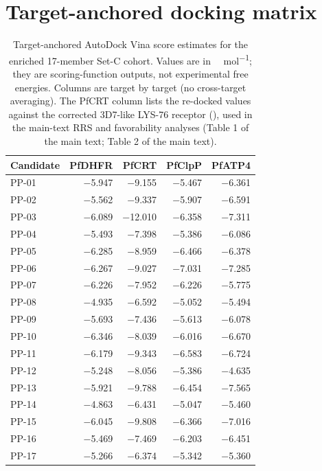 \documentclass[11pt,a4paper]{article}
\begin{document}
	\section{Target-anchored docking matrix}\label{sec:sm_vina_matrix}
	\begin{table}[ht!]
		\centering
		\caption{Target-anchored AutoDock Vina score estimates for the enriched 17-member Set-C cohort. Values are in \si{\kilo\calorie\per\mol}; they are scoring-function outputs, not experimental free energies. Columns are target by target (no cross-target averaging). The PfCRT column lists the re-docked values against the corrected 3D7-like LYS-76 receptor (), used in the main-text RRS and favorability analyses (Table 1 of the main text; Table 2 of the main text).}
		\label{tab:vina}
		\small
		\begin{tabular}{@{}lrrrr@{}}
			\toprule
			Candidate & PfDHFR & PfCRT & PfClpP & PfATP4 \\
			\midrule
			PP-01 & \num{-5.947} & \num{-9.155} & \num{-5.467} & \num{-6.361} \\
			PP-02 & \num{-5.562} & \num{-9.337} & \num{-5.907} & \num{-6.591} \\
			PP-03 & \num{-6.089} & \num{-12.010} & \num{-6.358} & \num{-7.311} \\
			PP-04 & \num{-5.493} & \num{-7.398} & \num{-5.386} & \num{-6.086} \\
			PP-05 & \num{-6.285} & \num{-8.959} & \num{-6.466} & \num{-6.378} \\
			PP-06 & \num{-6.267} & \num{-9.027} & \num{-7.031} & \num{-7.285} \\
			PP-07 & \num{-6.226} & \num{-7.952} & \num{-6.226} & \num{-5.775} \\
			PP-08 & \num{-4.935} & \num{-6.592} & \num{-5.052} & \num{-5.494} \\
			PP-09 & \num{-5.693} & \num{-7.436} & \num{-5.613} & \num{-6.078} \\
			PP-10 & \num{-6.346} & \num{-8.039} & \num{-6.016} & \num{-6.670} \\
			PP-11 & \num{-6.179} & \num{-9.343} & \num{-6.583} & \num{-6.724} \\
			PP-12 & \num{-5.248} & \num{-8.056} & \num{-5.386} & \num{-4.635} \\
			PP-13 & \num{-5.921} & \num{-9.788} & \num{-6.454} & \num{-7.565} \\
			PP-14 & \num{-4.863} & \num{-6.431} & \num{-5.047} & \num{-5.460} \\
			PP-15 & \num{-6.045} & \num{-9.808} & \num{-6.366} & \num{-7.016} \\
			PP-16 & \num{-5.469} & \num{-7.469} & \num{-6.203} & \num{-6.451} \\
			PP-17 & \num{-5.266} & \num{-6.374} & \num{-5.342} & \num{-5.360} \\
			\bottomrule
		\end{tabular}
	\end{table}
	
\end{document}
